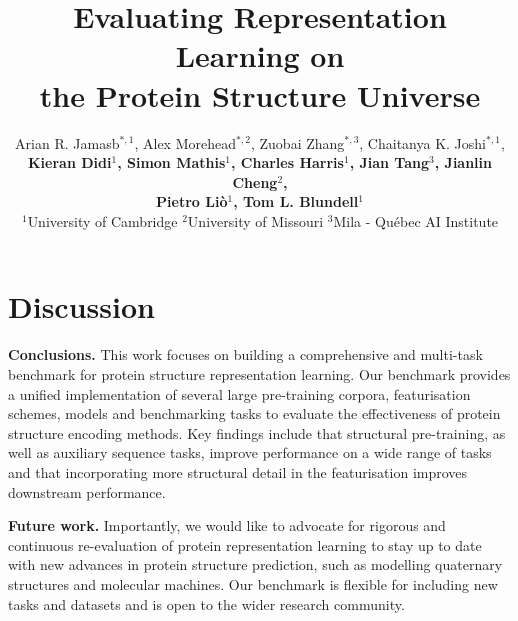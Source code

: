 \documentclass{article}
\title{Evaluating Representation Learning on \\ the Protein Structure Universe}
\author{%
  Arian R. Jamasb$^{*,1}$, Alex Morehead$^{*,2}$, Zuobai Zhang$^{*,3}$, Chaitanya K. Joshi$^{*,1}$, \\ 
  \textbf{Kieran Didi$^{1}$, Simon Mathis$^{1}$, Charles Harris$^{1}$, Jian Tang$^{3}$, Jianlin Cheng$^{2}$,} \\ 
  \textbf{Pietro Liò$^{1}$, Tom L. Blundell$^{1}$} \\
  $^{1}$University of Cambridge \quad $^{2}$University of Missouri \quad $^{3}$Mila - Qu\'ebec AI Institute \\
}
\begin{document}
\maketitle

\begin{abstract}

\end{abstract}









\section{Discussion}


\textbf{Conclusions.} This work focuses on building a comprehensive and multi-task benchmark for protein structure representation learning. Our benchmark provides a unified implementation of several large pre-training corpora, featurisation schemes, models and benchmarking tasks to evaluate the effectiveness of protein structure encoding methods.
Key findings include that structural pre-training, as well as auxiliary sequence tasks, improve performance on a wide range of tasks and that incorporating more structural detail in the featurisation improves downstream performance.


\textbf{Future work.} Importantly, we would like to advocate for rigorous and continuous re-evaluation of protein representation learning to stay up to date with new advances in protein structure prediction, such as modelling quaternary structures and molecular machines.
Our benchmark is flexible for including new tasks and datasets and is open to the wider research community.
\end{document}
